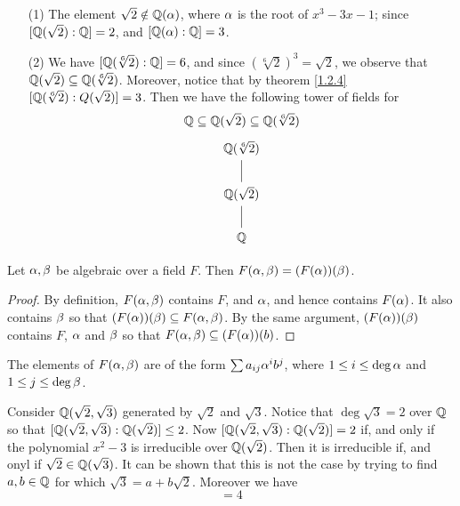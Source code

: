  \begin{example}\label{example_1.7}
     \begin{enumerate}
         \item[(1)] The element $\sqrt{2} \notin \mathbb{Q}(\alpha)$, where $\alpha$ is the root
             of  $x^3-3x-1$; since  $[\mathbb{Q}(\sqrt{2}) : \mathbb{Q}]=2$, and
             $[\mathbb{Q}(\alpha):\mathbb{Q}]=3$.

         \item[(2)] We have $[\mathbb{Q}(\sqrt[6]{2}):\mathbb{Q}]=6$, and since
             $(\sqrt[6]{2})^3=\sqrt{2}$, we observe that $\mathbb{Q}(\sqrt{2}) \subseteq
             \mathbb{Q}(\sqrt[6]{2})$. Moreover, notice that by theorem \ref{1.2.4}
             $[\mathbb{Q}(\sqrt[6]{2}):Q(\sqrt{2})]=3$. Then we have the following
             tower of fields for
             \begin{equation*}
                 \mathbb{Q} \subseteq \mathbb{Q}(\sqrt{2}) \subseteq \mathbb{Q}(\sqrt[6]{2})
             \end{equation*}
             \[\begin{tikzcd}
                {\Q(\sqrt[6]{2})} \\
                {\Q(\sqrt{2})} \\
                {\Q}
                \arrow[no head, from=1-1, to=2-1]
                \arrow[no head, from=2-1, to=3-1]
                \end{tikzcd}\]
     \end{enumerate}
 \end{example}

 \begin{lemma}\label{1.2.5}
     Let $\alpha,\beta$ be algebraic over a field  $F$. Then  $F(\alpha,\beta)=(F(\alpha))(\beta)$.
 \end{lemma}
 \begin{proof}
     By definition, $F(\alpha,\beta)$ contains $F$, and  $\alpha$, and hence contains
     $F(\alpha)$. It also contains $\beta$ so that  $(F(\alpha))(\beta) \subseteq  F(\alpha,\beta)$.
     By the same argument, $(F(\alpha))(\beta)$ contains $F$,  $\alpha$ and  $\beta$ so that
     $F(\alpha,\beta) \subseteq (F(\alpha))(b)$.
 \end{proof}
 \begin{corollary}
     The elements of $F(\alpha,\beta)$ are of the form $\sum{a_{ij}\alpha^ib^j}$, where $1
     \leq i \leq \deg{\alpha}$ and $1 \leq j \leq \deg{\beta}$.
 \end{corollary}

 \begin{example}\label{example_1.8}
     Consider $\mathbb{Q}(\sqrt{2},\sqrt{3})$ generated by $\sqrt{2}$ and $\sqrt{3}$.
     Notice that $\deg{\sqrt{3}}=2$ over $\mathbb{Q}$ so that $[\mathbb{Q}(\sqrt{2},\sqrt{3}) :
     \mathbb{Q}(\sqrt{2})] \leq 2$. Now $[\mathbb{Q}(\sqrt{2},\sqrt{3}):\mathbb{Q}(\sqrt{2})]=2$ if, and
     only if the polynomial  $x^2-3$ is irreducible over  $\mathbb{Q}(\sqrt{2})$. Then
     it is irreducible if, and onyl if $\sqrt{2} \in \mathbb{Q}(\sqrt{3})$. It can be
     shown that this is not the case by trying to find $a,b \in \mathbb{Q}$ for which
     $\sqrt{3}=a+b\sqrt{2}$. Moreover we have
     \begin{equation*}
        [\Q(\sqrt{2},\sqrt{3}):\Q]=4
     \end{equation*}
 \end{example}

